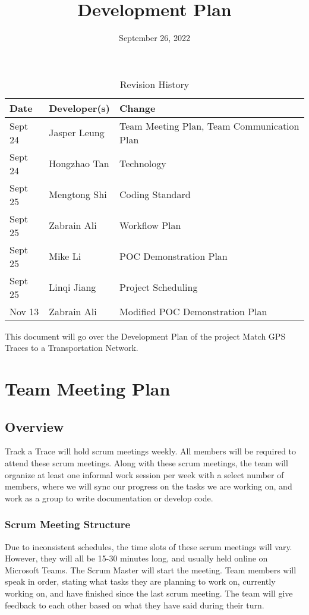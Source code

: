 \documentclass{article}
\title{Development Plan\\\progname}
\author{\authname}
\date{September 26, 2022}
\begin{document}
\begin{table}[hp]
\caption{Revision History} \label{TblRevisionHistory}
\begin{tabularx}{\textwidth}{llX}
\toprule
\textbf{Date} & \textbf{Developer(s)} & \textbf{Change}\\
\midrule
Sept 24 & Jasper Leung & Team Meeting Plan, Team Communication Plan\\
Sept 24 & Hongzhao Tan & Technology\\
Sept 25 & Mengtong Shi & Coding Standard\\
Sept 25 & Zabrain Ali & Workflow Plan\\
Sept 25 & Mike Li & POC Demonstration Plan\\
Sept 25 & Linqi Jiang & Project Scheduling\\
Nov 13 & Zabrain Ali & Modified POC Demonstration Plan \\
\bottomrule
\end{tabularx}
\end{table}

\newpage

\maketitle

This document will go over the Development Plan of the project Match GPS Traces to a Transportation Network.

\section{Team Meeting Plan}

\subsection{Overview}
Track a Trace will hold scrum meetings weekly. All members will be required to attend these scrum meetings. Along with these scrum meetings, the team will organize at least one informal work session per week with a select number of members, where we will sync our progress on the tasks we are working on, and work as a group to write documentation or develop code.

\subsubsection{Scrum Meeting Structure}
Due to inconsistent schedules, the time slots of these scrum meetings will vary. However, they will all be 15-30 minutes long, and usually held online on Microsoft Teams. The Scrum Master will start the meeting. Team members will speak in order, stating what tasks they are planning to work on, currently working on, and have finished since the last scrum meeting. The team will give feedback to each other based on what they have said during their turn.
\end{document}
